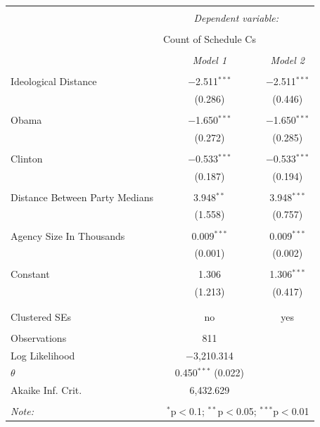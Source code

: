 \documentclass[12pt]{article}
\begin{document}
\begin{table}[!htbp] \centering 
  \caption{} 
  \label{} 
\begin{tabular}{@{\extracolsep{5pt}}lcc} 
\\[-1.8ex]\hline 
\hline \\[-1.8ex] 
 & \multicolumn{2}{c}{\textit{Dependent variable:}} \\ 
\cline{2-3} 
\\[-1.8ex] & Count of Schedule Cs &   \\ 
\\[-1.8ex] & \textit{Model 1} & \textit{Model 2} \\ 
\hline \\[-1.8ex] 
 Ideological Distance & $-$2.511$^{***}$ & $-$2.511$^{***}$ \\ 
  & (0.286) & (0.446) \\ 
  & & \\ 
 Obama & $-$1.650$^{***}$ & $-$1.650$^{***}$ \\ 
  & (0.272) & (0.285) \\ 
  & & \\ 
 Clinton & $-$0.533$^{***}$ & $-$0.533$^{***}$ \\ 
  & (0.187) & (0.194) \\ 
  & & \\ 
 Distance Between Party Medians & 3.948$^{**}$ & 3.948$^{***}$ \\ 
  & (1.558) & (0.757) \\ 
  & & \\ 
 Agency Size In Thousands & 0.009$^{***}$ & 0.009$^{***}$ \\ 
  & (0.001) & (0.002) \\ 
  & & \\ 
 Constant & 1.306 & 1.306$^{***}$ \\ 
  & (1.213) & (0.417) \\ 
  & & \\ 
\hline \\[-1.8ex] 
  Clustered SEs & no & yes\\ 
\hline \\[-1.8ex] 
Observations & 811 &  \\ 
Log Likelihood & $-$3,210.314 &  \\ 
$\theta$ & 0.450$^{***}$  (0.022) &  \\ 
Akaike Inf. Crit. & 6,432.629 &  \\ 
\hline 
\hline \\[-1.8ex] 
\textit{Note:}  & \multicolumn{2}{r}{$^{*}$p$<$0.1; $^{**}$p$<$0.05; $^{***}$p$<$0.01} \\ 
\end{tabular} 
\end{table} 
\end{document}
